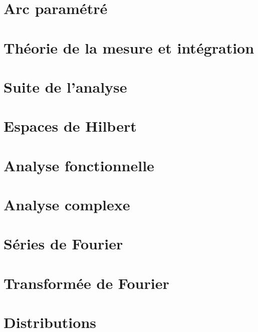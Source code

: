 \chapter{Arc paramétré}


\chapter{Théorie de la mesure et intégration}






\chapter{Suite de l'analyse}





\chapter{Espaces de Hilbert}


\chapter{Analyse fonctionnelle}



\chapter{Analyse complexe}



\chapter{Séries de Fourier}


\chapter{Transformée de Fourier}


\chapter{Distributions}



